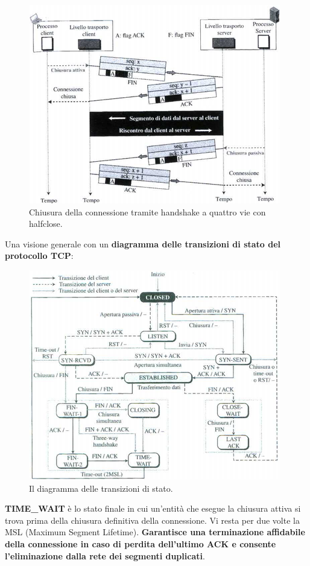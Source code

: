\documentclass[11pt,a4paper,oneside]{book}
\theoremstyle{definition}
\begin{document}
\pagebreak

\begin{figure}[!h]
	\includegraphics[scale=0.5]{Immagini/Halfway.png}
	\centering
	\caption{Chiusura della connessione tramite handshake a quattro vie con halfclose.}
\end{figure}
Una visione generale con un \textbf{diagramma delle transizioni di stato del protocollo TCP}:
\begin{figure}[!h]
	\includegraphics[scale=0.7]{Immagini/ASFTCP.png}
	\centering
	\caption{Il diagramma delle transizioni di stato.}
\end{figure}\newline
\textbf{TIME\_WAIT} è lo stato finale in cui un'entità che esegue la
chiusura attiva si trova prima della chiusura definitiva della connessione. Vi resta per due volte la MSL (Maximum Segment Lifetime). \textbf{Garantisce una terminazione affidabile della connessione in caso di perdita dell'ultimo ACK e consente l'eliminazione dalla rete dei segmenti duplicati}.
\end{document}
